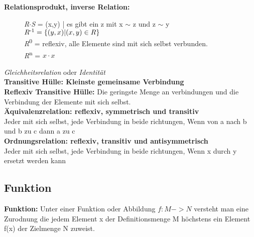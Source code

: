 \textbf{Relationsprodukt, inverse Relation:}  \\

\begin{figure}[H]
\centering
\textit{R}$\cdot$\textit{S} = (x,y) | es gibt ein z mit x $\sim$ z und z $\sim$ y\\
$R\textsuperscript{-1} =  \{ (y,x)|(x,y) \in R \}$ \\
\textit{R}\textsuperscript{0} = reflexiv, alle Elemente sind mit sich selbst verbunden.\\
\textit{R}\textsuperscript{n} = $x \cdot x$\\

\end{figure}





\textit{Gleichheitsrelation} oder \textit{Identität}\\

\textbf{Transitive Hülle: Kleinste gemeinsame Verbindung}\\

\textbf{Reflexiv Transitive Hülle:} Die geringste Menge an verbindungen und die Verbindung der Elemente mit sich selbst.\\

\textbf{Äquivalenzrelation: reflexiv, symmetrisch und transitiv}\\
Jeder mit sich selbst, jede Verbindung in beide richtungen, Wenn von a nach b und b zu c dann a zu c\\

\textbf{Ordnungsrelation: reflexiv, transitiv und antisymmetrisch} \\
Jeder mit sich selbst, jede Verbindung in beide richtungen, Wenn x durch y ersetzt werden kann \\





\subsection{Funktion}

\textbf{Funktion:} Unter einer Funktion oder Abbildung $f: M -> N$ versteht man eine Zurodnung die jedem Element x der Definitionsmenge M höchstens ein Element f(x) der Zielmenge N zuweist.

\begin{figure}
\centering
\end{figure}

